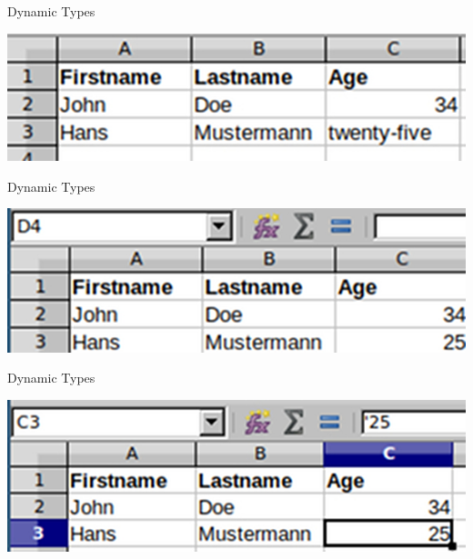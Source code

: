 \documentclass[aspectratio=169,notes]{beamer}
\begin{document}
	\begin{frame}[fragile]{Dynamic Types}
		\begin{center}
		\includegraphics[width=1.0\textwidth]{exceldynamic.jpg}
		\end{center}
	\end{frame}

	\begin{frame}[fragile]{Dynamic Types}
		\begin{center}
		\includegraphics[width=1.0\textwidth]{exceldynamic2.jpg}
		\end{center}
	\end{frame}

	\begin{frame}[fragile]{Dynamic Types}
		\begin{center}
		\includegraphics[width=1.0\textwidth]{exceldynamic3.jpg}
		\end{center}
	\end{frame}
\end{document}
